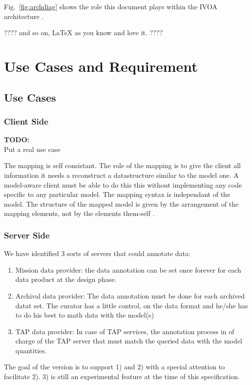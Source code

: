 \documentclass[11pt,a4paper]{ivoa}
\newcommand{\TODO}[1]{%
    \noindent%
    \colorbox{todocolor}{%
            \parbox{0.85\linewidth}{\sffamily \textbf{TODO:}\\
            #1}
    }%
    \vspace{2pt}

}
\begin{document}
Fig.~\ref{fig:archdiag} shows the role this document plays within the
IVOA architecture \citep{note:VOARCH}.

???? and so on, LaTeX as you know and love it. ????

\section{Use Cases and Requirement}

\subsection{Use Cases}

\subsubsection{Client Side}
\TODO{Put a real use case}
The mapping is self consistant. The role of the mapping is to give the client all information it needs a reconstruct a datastructure similar to the model one. 
A model-aware client must be able to do this  this without implementing any code specific to any particular model.  The mapping syntax is independant of the model. The structure of the mapped model is given by the arrangement of the mapping elements, not by the elements them-self
.

\subsubsection{Server Side}
We have identified 3 sorts of servers that could annotate data:
\begin{enumerate}
   \item Mission data provider: the data annotation can be set once forever for each data product at the design phase.
   \item Archival data provider: The data annotation must be done for each archived datat set. The curator has a little control, on the data format and he/she has to do his best to math data with the model(s) 
   \item  TAP data provider: In case of TAP services, the annotation process in of charge of the TAP server that must match the queried data with the model quantities.
\end{enumerate}

The goal of the version is to support 1) and 2) with a special attention to facilitate 2). 3) is still an experimental feature at the time of this specification.
\end{document}

